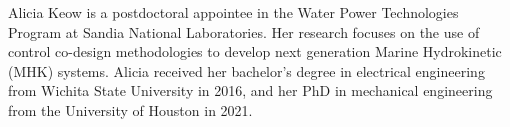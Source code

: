 \documentclass[lettersize,journal]{IEEEtran}
\begin{document}
\begin{IEEEbiography}{Alicia Keow}
is a postdoctoral appointee in the Water Power Technologies Program at Sandia National Laboratories.
Her research focuses on the use of control co-design methodologies to develop next generation Marine Hydrokinetic (MHK) systems.
Alicia received her bachelor's degree in electrical engineering from Wichita State University in 2016, and her PhD in mechanical engineering from the University of Houston in 2021.
\end{IEEEbiography}
\end{document}
